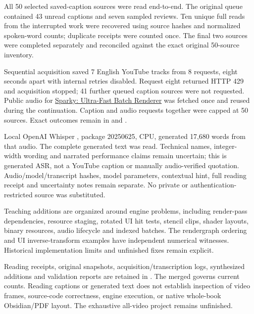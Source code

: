 \hypertarget{appendix-877738f6f4d2-batch-004-render-graphs-ui-geometry-and-renderer-ownership}{}

All 50 selected saved-caption sources were read end-to-end. The original queue contained 43 unread captions and seven sampled reviews. Ten unique full reads from the interrupted work were recovered using source hashes and normalized spoken-word counts; duplicate receipts were counted once. The final two sources were completed separately and reconciled against the exact original 50-source inventory.

Sequential acquisition saved 7 English YouTube tracks from 8 requests, eight seconds apart with internal retries disabled. Request eight returned HTTP 429 and acquisition stopped; 41 further queued caption sources were not requested. Public audio for \href{https://www.youtube.com/watch?v=ImtWD_9OAeY}{Sparky: Ultra-Fast Batch Renderer} was fetched once and reused during the continuation. Caption and audio requests together were capped at 50 sources. Exact outcomes remain in  and .

Local OpenAI Whisper , package 20250625, CPU, generated 17,680 words from that audio. The complete generated text was read. Technical names, integer-width wording and narrated performance claims remain uncertain; this is generated ASR, not a YouTube caption or manually audio-verified quotation. Audio/model/transcript hashes, model parameters, contextual hint, full reading receipt and uncertainty notes remain separate. No private or authentication-restricted source was substituted.

Teaching additions are organized around engine problems, including render-pass dependencies, resource staging, rotated UI hit tests, stencil clips, shader layouts, binary resources, audio lifecycle and indexed batches. The rendergraph ordering and UI inverse-transform examples have independent numerical witnesses. Historical implementation limits and unfinished fixes remain explicit.

Reading receipts, original snapshots, acquisition/transcription logs, synthesized additions and validation reports are retained in . The merged  governs current counts. Reading captions or generated text does not establish inspection of video frames, source-code correctness, engine execution, or native whole-book Obsidian/PDF layout. The exhaustive all-video project remains unfinished.

